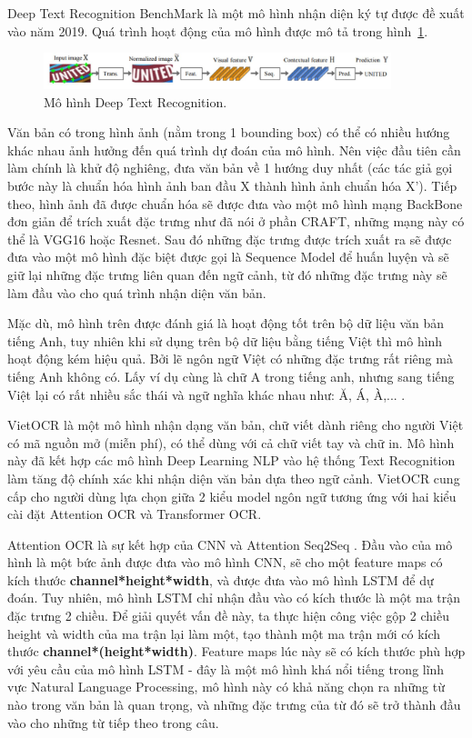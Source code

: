 Deep Text Recognition BenchMark là một mô hình nhận diện ký tự được đề xuất vào năm 2019. Quá trình hoạt động của mô hình được mô tả
trong hình~\ref{fig_2.8}.

\begin{figure}
\centering
\includegraphics[width=0.9\textwidth]{mep_img/Capture5.JPG}
\caption{Mô hình Deep Text Recognition.}\label{fig_2.8}
\end{figure}
Văn bản có trong hình ảnh (nằm trong 1 bounding box) có thể có nhiều hướng khác nhau
ảnh hưởng đến quá trình dự đoán của mô hình. Nên việc đầu tiên cần làm chính là khử độ
nghiêng, đưa văn bản về 1 hướng duy nhất (các tác giả gọi bước này là chuẩn hóa hình ảnh
ban đầu X thành hình ảnh chuẩn hóa X’). Tiếp theo, hình ảnh đã được chuẩn hóa sẽ được
đưa vào một mô hình mạng BackBone đơn giản để trích xuất đặc trưng như đã nói ở phần
CRAFT, những mạng này có thể là VGG16 hoặc Resnet. Sau đó những đặc trưng được
trích xuất ra sẽ được đưa vào một mô hình đặc biệt được gọi là Sequence Model để huấn
luyện và sẽ giữ lại những đặc trưng liên quan đến ngữ cảnh, từ đó những đặc trưng này sẽ
làm đầu vào cho quá trình nhận diện văn bản.

Mặc dù, mô hình trên được đánh giá là hoạt động tốt trên bộ dữ liệu văn bản tiếng Anh, tuy
nhiên khi sử dụng trên bộ dữ liệu bằng tiếng Việt thì mô hình hoạt động kém hiệu quả. Bởi
lẽ ngôn ngữ Việt có những đặc trưng rất riêng mà tiếng Anh không có. Lấy ví dụ cùng là chữ
A trong tiếng anh, nhưng sang tiếng Việt lại có rất nhiều sắc thái và ngữ nghĩa khác nhau
như: Ă, Á, À,... .

VietOCR \cite{VietOCR} là một mô hình nhận dạng văn bản, chữ viết dành riêng cho người Việt có mã
nguồn mở (miễn phí), có thể dùng với cả chữ viết tay và chữ in. Mô hình này đã kết hợp các
mô hình Deep Learning NLP vào hệ thống Text Recognition làm tăng độ chính xác khi nhận
diện văn bản dựa theo ngữ cảnh. VietOCR cung cấp cho người dùng lựa chọn giữa 2 kiểu
model ngôn ngữ tương ứng với hai kiểu cài đặt Attention OCR và Transformer OCR.

Attention OCR \cite{VietOCR} là sự kết hợp của CNN và Attention Seq2Seq \cite{galassi2020attention}. Đầu vào của mô hình là một
bức ảnh được đưa vào mô hình CNN, sẽ cho một feature maps có kích thước
\textbf{channel*height*width}, và được đưa vào mô hình LSTM để dự đoán. Tuy nhiên, mô hình
LSTM chỉ nhận đầu vào có kích thước là một ma trận đặc trưng 2 chiều. Để giải quyết vấn
đề này, ta thực hiện công việc gộp 2 chiều height và width của ma trận lại làm một, tạo
thành một ma trận mới có kích thước \textbf{channel*(height*width)}. Feature maps lúc này sẽ có
kích thước phù hợp với yêu cầu của mô hình LSTM - đây là một mô hình khá nổi tiếng trong
lĩnh vực Natural Language Processing, mô hình này có khả năng chọn ra những từ nào
trong văn bản là quan trọng, và những đặc trưng của từ đó sẽ trở thành đầu vào cho những
từ tiếp theo trong câu.

